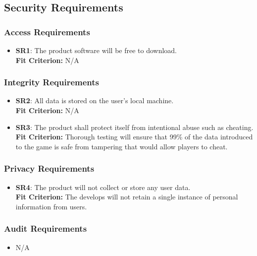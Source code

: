 \documentclass[12pt, titlepage]{article}
\begin{document}
\subsection{Security Requirements}
\subsubsection{Access Requirements}
\begin{itemize}
    \item \textbf{SR1}: The product software will be free to download.\\
    \textbf{Fit Criterion:} N/A
\end{itemize}

\subsubsection{Integrity Requirements}
\begin{itemize}
    \item \textbf{SR2}: All data is stored on the user’s local machine.\\
    \textbf{Fit Criterion:} N/A
    
    
    \item \textbf{SR3}: The product shall protect itself from intentional abuse such as cheating.\\
    \textbf{Fit Criterion:} Thorough testing will ensure that 99\% of the data introduced to the game is safe from tampering that would allow players to cheat.
    
\end{itemize}

\subsubsection{Privacy Requirements}
\begin{itemize}
    \item \textbf{SR4}: The product will not collect or store any user data.\\
    \textbf{Fit Criterion:} The develops will not retain a single instance of personal information from users.
\end{itemize}

\subsubsection{Audit Requirements}
\begin{itemize}
    \item N/A
\end{itemize}
\end{document}
